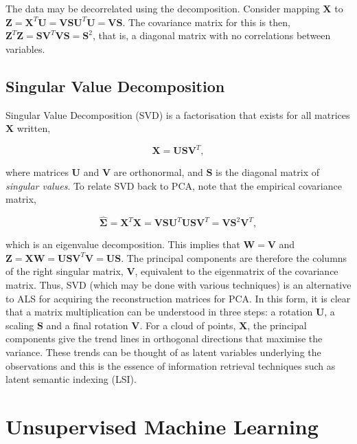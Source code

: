 \documentclass[11pt]{amsart}
\begin{document}


The data may be decorrelated using the decomposition. Consider mapping $\mathbf{X}$ to $\mathbf{Z} = \mathbf{X}^T\mathbf{U} = \mathbf{V}\mathbf{S}\mathbf{U}^T\mathbf{U} = \mathbf{V}\mathbf{S}$. The covariance matrix for this is then, $\mathbf{Z}^T\mathbf{Z} = \mathbf{S}\mathbf{V}^T\mathbf{V}\mathbf{S} = \mathbf{S}^2$, that is, a diagonal matrix with no correlations between variables.


\subsection{Singular Value Decomposition}

Singular Value Decomposition (SVD) is a factorisation that exists for all matrices $\mathbf{X}$ written,

$$\mathbf{X} = \mathbf{U}\mathbf{S}\mathbf{V}^T,$$

where matrices $\mathbf{U}$ and $\mathbf{V}$ are orthonormal, and $\mathbf{S}$ is the diagonal matrix of \emph{singular values}. To relate SVD back to PCA, note that the empirical covariance matrix,

$$\hat{\boldsymbol\Sigma} = \mathbf{X}^T\mathbf{X} = \mathbf{V}\mathbf{S}\mathbf{U}^T\mathbf{U}\mathbf{S}\mathbf{V}^T =  \mathbf{V}\mathbf{S}^2\mathbf{V}^T,$$

which is an eigenvalue decomposition. This implies that $\mathbf{W} = \mathbf{V}$ and $\mathbf{Z} = \mathbf{X}\mathbf{W} = \mathbf{U}\mathbf{S}\mathbf{V}^T\mathbf{V} = \mathbf{U}\mathbf{S}$. The principal components are therefore the columns of the right singular matrix, $\mathbf{V}$, equivalent to the eigenmatrix of the covariance matrix. Thus, SVD (which may be done with various techniques) is an alternative to ALS for acquiring the reconstruction matrices for PCA. In this form, it is clear that a matrix multiplication can be understood in three steps: a rotation $\mathbf{U}$, a scaling $\mathbf{S}$ and a final rotation $\mathbf{V}$. For a cloud of points, $\mathbf{X}$, the principal components give the trend lines in orthogonal directions that maximise the variance. These trends can be thought of as latent variables underlying the observations and this is the essence of information retrieval techniques such as latent semantic indexing (LSI).

\section{Unsupervised Machine Learning}
\end{document}
